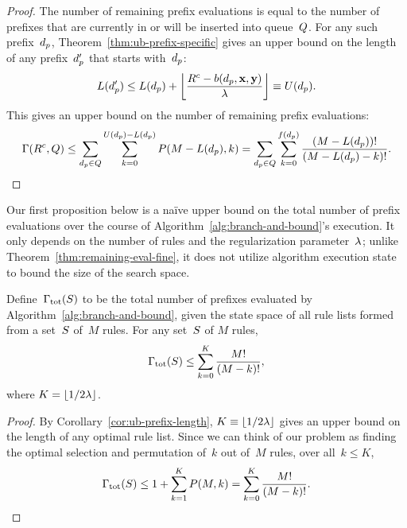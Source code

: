 \begin{proof}
The number of remaining prefix evaluations is equal to the number of
prefixes that are currently in or will be inserted into queue~$Q$.
%
For any such prefix~$d_p$, Theorem~\ref{thm:ub-prefix-specific}
gives an upper bound on the length of any prefix~$d_p'$
that starts with~$d_p$:
\begin{align}
L(\Prefix') \le L(\Prefix) + \left\lfloor \frac{\CurrentObj - b(\Prefix, \x, \y)}{\Reg} \right\rfloor
\equiv U(\Prefix).
\end{align}
This gives an upper bound on the number of remaining prefix evaluations:
\begin{align}
\Remaining(\CurrentObj, \Queue)
\le \sum_{\Prefix \in Q} \sum_{k=0}^{U(\Prefix) - L(\Prefix)} P(M - L(\Prefix), k)
= \sum_{\Prefix \in Q} \sum_{k=0}^{f(\Prefix)} \frac{(M - L(\Prefix))!}{(M - L(\Prefix) - k)!}.
\end{align}
\end{proof}

Our first proposition below is a na\"ive upper bound on
the total number of prefix evaluations over the course of
Algorithm~\ref{alg:branch-and-bound}'s execution.
%
It only depends on the number of rules and
the regularization parameter~${\lambda}$;
\ie unlike Theorem~\ref{thm:remaining-eval-fine},
it does not utilize algorithm execution state to
bound the size of the search space.

\begin{proposition}
\label{thm:ub-total-eval}
Define~${\Gamma_{\textnormal{tot}}}(S)$ to be the total number of prefixes
evaluated by Algorithm~\ref{alg:branch-and-bound}, given the state space of
all rule lists formed from a set~$S$ of~$M$ rules.
%
For any set~$S$ of $M$ rules,
\begin{align}
\TotalRemaining(\RuleSet) \le \sum_{k=0}^K \frac{M!}{(M - k)!},
\label{eq:size-naive}
\end{align}
where ${K = \lfloor 1/2 {\lambda} \rfloor}$.
\end{proposition}

\begin{proof}
By Corollary~\ref{cor:ub-prefix-length},
${K \equiv \lfloor 1 / 2 {\lambda} \rfloor}$
gives an upper bound on the length of any optimal rule list.
%
Since we can think of our problem as finding the optimal
selection and permutation of~$k$ out of~$M$ rules,
over all~${k \le K}$,
\begin{align}
\TotalRemaining(\RuleSet) \le 1 + \sum_{k=1}^K P(M, k)
= \sum_{k=0}^K \frac{M!}{(M - k)!}.
\end{align}
\end{proof}

